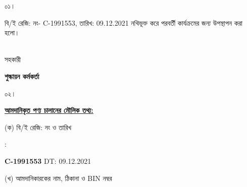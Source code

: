 \documentclass[12pt]{article}
\newcommand{\beno}{C-1991553}
\newcommand{\bedt}{09.12.2021}
\begin{document}
\noindent
\begin{minipage}[t]{0.05\linewidth}
০১।
\end{minipage}
\begin{minipage}[t]{0.95\linewidth}
বি/ই রেজি: নং- {\beno}, তারিখ: {\bedt}
নথিভূক্ত করে
পরবর্তী কার্যক্রমের জন্য উপস্থাপন করা হলো।
\\
\\
\end{minipage}
\begin{minipage}[t]{0.05\linewidth}
\hspace*{0em}
\end{minipage}
\begin{minipage}[t]{0.05\linewidth}
সহকারী
\end{minipage}
\begin{minipage}[t]{0.37\linewidth}
\hspace{0em}
\end{minipage}
\begin{minipage}[t]{0.53\linewidth}
\textbf{শুল্কায়ন কর্মকর্তা}
\\
\end{minipage}
\begin{minipage}[t]{0.05\linewidth}
০২।
\end{minipage}
\begin{minipage}[t]{0.95\linewidth}
\underline{\textbf {আমদানিকৃত পণ্য চালানের
মৌলিক তথ্য:}}
\\
\end{minipage}
\footnotesize
\begin{minipage}[t]{0.05\linewidth}
\hspace*{1em}
\end{minipage}
\begin{minipage}[t]{0.40\linewidth}
(ক) বি/ই রেজি: নং ও তারিখ
\end{minipage}
\begin{minipage}[t]{0.02\linewidth}
:
\end{minipage}
\begin{minipage}[t]{0.53\linewidth}
\textbf{{\beno}} \hspace{2em} DT: {\bedt}
\\
\end{minipage}
\begin{minipage}[t]{0.05\linewidth}
\hspace*{1em}
\end{minipage}
\begin{minipage}[t]{0.40\linewidth}
(খ) আমদানিকারকের নাম, ঠিকানা
ও BIN নম্বর
\end{minipage}
\end{document}
